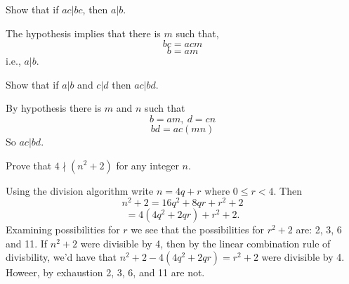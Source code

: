 \begin{questions}
    \question[3] Show that if $ac | bc$, then $a | b$.
    \begin{solution}
        The hypothesis implies that there is $m$ such that,
        $$bc = acm$$
        $$b = am$$
        i.e., $a | b$.
    \end{solution}

    \question[3] Show that if $a | b$ and $c | d$ then $ac | bd$.
    \begin{solution}
        By hypothesis there is $m$ and $n$ such that
        $$b = am,\ d = cn$$
        $$bd = ac(mn)$$
        So $ac | bd.$
    \end{solution}

    \question[8] Prove that $4 \nmid (n^2 + 2)$ for any integer $n$.
    \begin{solution}
        Using the division algorithm write $n = 4q + r$ where $0 \le r
        < 4.$ Then 
        $$n^2 + 2 = 16q^2 + 8qr + r^2 + 2$$
        $$ = 4(4q^2 + 2qr) + r^2 + 2.$$
        Examining possibilities for $r$ we see that the possibilities
        for $r^2 + 2$ are: 2, 3, 6 and 11. If $n^2 + 2$ were divisible
        by 4, then by the linear combination rule of divisbility, we'd
        have that $n^2 +2 - 4(4q^2 + 2qr) = r^2 + 2$ were divisible by
        4. Howeer, by exhaustion 2, 3, 6, and 11 are not. 
    \end{solution}
\end{questions}


